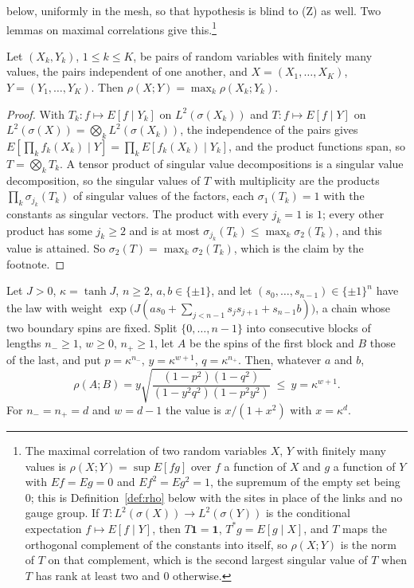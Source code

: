 below, uniformly in the mesh, so that hypothesis is blind to (Z) as well.
Two lemmas on maximal correlations give this.\footnote{The maximal
correlation of two random variables $X$, $Y$ with finitely many values is
$\rho(X;Y)=\sup E[fg]$ over $f$ a function of $X$ and $g$ a function of $Y$
with $Ef=Eg=0$ and $Ef^2=Eg^2=1$, the supremum of the empty set being $0$;
this is Definition~\ref{def:rho} below with the sites in place of the links
and no gauge group. If $T:L^2(\sigma(X))\to L^2(\sigma(Y))$ is the
conditional expectation $f\mapsto E[f\mid Y]$, then $T\mathbf 1=\mathbf 1$,
$T^*g=E[g\mid X]$, and $T$ maps the orthogonal complement of the constants
into itself, so $\rho(X;Y)$ is the norm of $T$ on that complement, which is
the second largest singular value of $T$ when $T$ has rank at least two and
$0$ otherwise.}

\begin{lemma}\label{lem:tensorrho}
Let $(X_k,Y_k)$, $1\le k\le K$, be pairs of random variables with finitely
many values, the pairs independent of one another, and $X=(X_1,\dots,X_K)$,
$Y=(Y_1,\dots,Y_K)$. Then $\rho(X;Y)=\max_k\rho(X_k;Y_k)$.
\end{lemma}

\begin{proof}
With $T_k:f\mapsto E[f\mid Y_k]$ on $L^2(\sigma(X_k))$ and $T:f\mapsto
E[f\mid Y]$ on $L^2(\sigma(X))=\bigotimes_kL^2(\sigma(X_k))$, the independence
of the pairs gives $E[\prod_kf_k(X_k)\mid Y]=\prod_kE[f_k(X_k)\mid Y_k]$, and
the product functions span, so $T=\bigotimes_kT_k$. A tensor product of
singular value decompositions is a singular value decomposition, so the
singular values of $T$ with multiplicity are the products
$\prod_k\sigma_{j_k}(T_k)$ of singular values of the factors, each
$\sigma_1(T_k)=1$ with the constants as singular vectors. The product with
every $j_k=1$ is $1$; every other product has some $j_k\ge2$ and is at most
$\sigma_{j_k}(T_k)\le\max_k\sigma_2(T_k)$, and this value is attained. So
$\sigma_2(T)=\max_k\sigma_2(T_k)$, which is the claim by the footnote.
\end{proof}

\begin{lemma}\label{lem:chainblocks}
Let $J>0$, $\kappa=\tanh J$, $n\ge2$, $a,b\in\{\pm1\}$, and let
$(s_0,\dots,s_{n-1})\in\{\pm1\}^n$ have the law with weight
$\exp\bigl(J(as_0+\sum_{j<n-1}s_js_{j+1}+s_{n-1}b)\bigr)$, a chain whose two
boundary spins are fixed. Split $\{0,\dots,n-1\}$ into consecutive blocks
of lengths $n_-\ge1$, $w\ge0$, $n_+\ge1$, let $A$ be the spins of the first
block and $B$ those of the last, and put $p=\kappa^{n_-}$, $y=\kappa^{w+1}$,
$q=\kappa^{n_+}$. Then, whatever $a$ and $b$,
\[
\rho(A;B)=y\sqrt{\frac{(1-p^2)(1-q^2)}{(1-y^2q^2)(1-p^2y^2)}}\ \le\
y=\kappa^{w+1}.
\]
For $n_-=n_+=d$ and $w=d-1$ the value is $x/(1+x^2)$ with $x=\kappa^d$.
\end{lemma}

